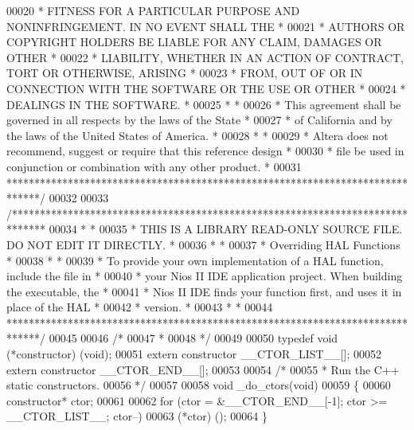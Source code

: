 \begin{DoxyCode}
00020 \textcolor{comment}{* FITNESS FOR A PARTICULAR PURPOSE AND NONINFRINGEMENT. IN NO EVENT SHALL THE *}
00021 \textcolor{comment}{* AUTHORS OR COPYRIGHT HOLDERS BE LIABLE FOR ANY CLAIM, DAMAGES OR OTHER      *}
00022 \textcolor{comment}{* LIABILITY, WHETHER IN AN ACTION OF CONTRACT, TORT OR OTHERWISE, ARISING     *}
00023 \textcolor{comment}{* FROM, OUT OF OR IN CONNECTION WITH THE SOFTWARE OR THE USE OR OTHER         *}
00024 \textcolor{comment}{* DEALINGS IN THE SOFTWARE.                                                   *}
00025 \textcolor{comment}{*                                                                             *}
00026 \textcolor{comment}{* This agreement shall be governed in all respects by the laws of the State   *}
00027 \textcolor{comment}{* of California and by the laws of the United States of America.              *}
00028 \textcolor{comment}{*                                                                             *}
00029 \textcolor{comment}{* Altera does not recommend, suggest or require that this reference design    *}
00030 \textcolor{comment}{* file be used in conjunction or combination with any other product.          *}
00031 \textcolor{comment}{******************************************************************************/}
00032 
00033 \textcolor{comment}{/******************************************************************************}
00034 \textcolor{comment}{*                                                                             *}
00035 \textcolor{comment}{* THIS IS A LIBRARY READ-ONLY SOURCE FILE. DO NOT EDIT IT DIRECTLY.           *}
00036 \textcolor{comment}{*                                                                             *}
00037 \textcolor{comment}{* Overriding HAL Functions                                                    *}
00038 \textcolor{comment}{*                                                                             *}
00039 \textcolor{comment}{* To provide your own implementation of a HAL function, include the file in   *}
00040 \textcolor{comment}{* your Nios II IDE application project. When building the executable, the     *}
00041 \textcolor{comment}{* Nios II IDE finds your function first, and uses it in place of the HAL      *}
00042 \textcolor{comment}{* version.                                                                    *}
00043 \textcolor{comment}{*                                                                             *}
00044 \textcolor{comment}{******************************************************************************/}
00045 
00046 \textcolor{comment}{/*}
00047 \textcolor{comment}{ * }
00048 \textcolor{comment}{ */}
00049 
00050 \textcolor{keyword}{typedef} void (*constructor) (void);
00051 \textcolor{keyword}{extern} constructor __CTOR_LIST__[];
00052 \textcolor{keyword}{extern} constructor __CTOR_END__[];
00053 
00054 \textcolor{comment}{/*}
00055 \textcolor{comment}{ * Run the C++ static constructors.}
00056 \textcolor{comment}{ */}
00057 
00058 \textcolor{keywordtype}{void} _do_ctors(\textcolor{keywordtype}{void})
00059 \{
00060   constructor* ctor;
00061 
00062   \textcolor{keywordflow}{for} (ctor = &__CTOR_END__[-1]; ctor >= __CTOR_LIST__; ctor--)
00063         (*ctor) (); 
00064 \}
\end{DoxyCode}
